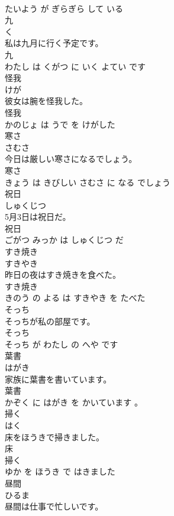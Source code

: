 \documentclass[8pt]{extreport}
\begin{document}
\begin{CJK}{UTF8}{min}
\\	たいよう が ぎらぎら して いる			
\\	九	
\\	く			
\\	私は九月に行く予定です。	
\\	九 
\\	わたし は くがつ に いく よてい です			
\\	怪我	
\\	けが			
\\	彼女は腕を怪我した。	
\\	怪我 
\\	かのじょ は うで を けがした			
\\	寒さ	
\\	さむさ			
\\	今日は厳しい寒さになるでしょう。	
\\	寒さ 
\\	きょう は きびしい さむさ に なる でしょう			
\\	祝日	
\\	しゅくじつ			
\\	5月3日は祝日だ。	
\\	祝日 
\\	ごがつ みっか は しゅくじつ だ			
\\	すき焼き	
\\	すきやき			
\\	昨日の夜はすき焼きを食べた。	
\\	すき焼き 
\\	きのう の よる は すきやき を たべた			
\\	そっち	
\\	そっちが私の部屋です。	
\\	そっち 
\\	そっち が わたし の へや です			
\\	葉書	
\\	はがき			
\\	家族に葉書を書いています。	
\\	葉書 
\\	かぞく に はがき を かいています 。			
\\	掃く	
\\	はく			
\\	床をほうきで掃きました。	
\\	床 
\\	掃く 
\\	ゆか を ほうき で はきました			
\\	昼間	
\\	ひるま			
\\	昼間は仕事で忙しいです。	

\end{CJK}
\end{document}
